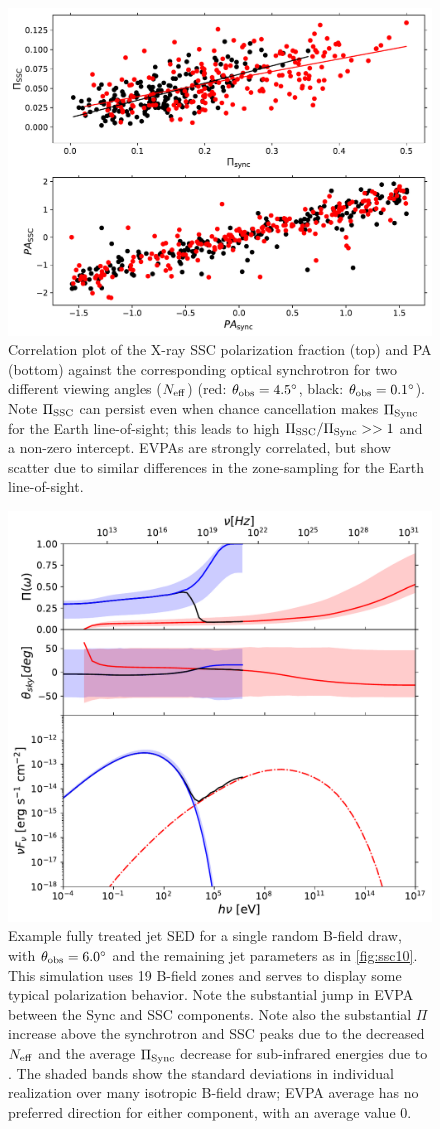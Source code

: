 \begin{figure}[t]
 \includegraphics[width=0.7\linewidth]{figures/Figure11.pdf}
 \centering
 \caption{Correlation plot of the X-ray SSC polarization fraction (top) and PA (bottom) against the corresponding optical synchrotron for two different viewing angles ($N_{\rm eff}$) (red: $\theta_{\rm obs} = 4.5^{\circ}$, black: $\theta_{\rm obs} = 0.1^{\circ}$). Note $\Pi_{\rm SSC}$ can persist even when chance cancellation makes $\Pi_{\rm Sync}$ for the Earth line-of-sight; this leads to high $\Pi_{\rm SSC} / \Pi_{\rm Sync} >> 1$ and a non-zero intercept.
 EVPAs are strongly correlated, but show scatter due to similar differences in the zone-sampling for the Earth line-of-sight.}
 \label{fig:ssc11}
 \end{figure}
 
 \begin{figure}[t!]
\includegraphics[width=0.65\linewidth]{figures/Figure12.pdf}
 \centering
\caption{Example fully treated jet SED for a single random B-field draw, with $\theta_{\rm obs} = 6.0^\circ$ and the remaining jet parameters as in \cref{fig:ssc10}. This simulation uses 19 B-field zones and serves to display some typical polarization behavior. Note the substantial jump in EVPA between the Sync and SSC components. Note also the substantial $\Pi$ increase above the synchrotron and SSC peaks due to the decreased $N_{\rm eff}$ and the average $\Pi_{\rm Sync}$ decrease for sub-infrared energies due to . The shaded bands show the standard deviations in individual realization over many isotropic B-field draw; EVPA average has no preferred direction for either component, with an average value 0.}
 \label{fig:ssc12}
\end{figure}

